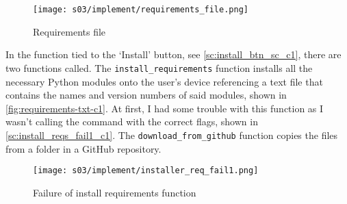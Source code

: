     \begin{figure}[!ht]
        \centering
        \texttt{[image: s03/implement/requirements\_file.png]}
        \caption{Requirements file}
        \label{fig:requirements-txt-c1}
    \end{figure}

    In the function tied to the `Install' button, see \autoref{sc:install_btn_sc_c1}, there are two functions called.
    The \verb|install_requirements| function installs all the necessary Python modules onto the user's device referencing a text file that contains the names and version numbers of said modules, shown in \autoref{fig:requirements-txt-c1}. 
    At first, I had some trouble with this function as I wasn't calling the command with the correct flags, shown in \autoref{sc:install_reqs_fail1_c1}. 
    The \verb|download_from_github| function copies the files from a folder in a GitHub repository. 




    \begin{figure}[!ht]
        \centering
        \texttt{[image: s03/implement/installer\_req\_fail1.png]}
        \caption{Failure of install requirements function}
        \label{fig:install_reqs_fail_pf_c1}
    \end{figure}
    
